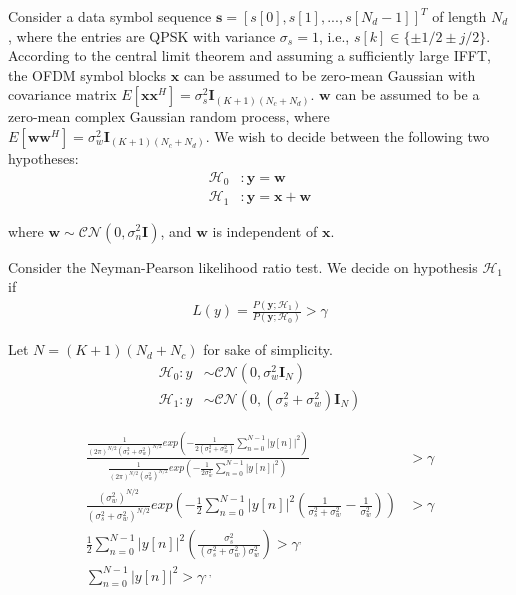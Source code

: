 \documentclass[a4 paper]{article}
\begin{document}
\setlength{\abovedisplayskip}{3pt}
\setlength{\belowdisplayskip}{3pt}


Consider a data symbol sequence $\mathbf{s} = [s[0], s[1], ..., s[N_{d} - 1]]^{T}$ of length $N_{d}$ , where the entries are QPSK with variance $\sigma_{s} = 1$, i.e., $s[k] \in \{\pm 1/ 2 \pm j/ 2\}$. According to the central limit theorem and assuming a sufficiently large IFFT, the OFDM symbol blocks $\mathbf{x}$ can be assumed to be zero-mean Gaussian with covariance matrix $E[\mathbf{x}\mathbf{x}^{H}] = \sigma_{s}^{2}\mathbf{I}_{(K+1)(N_{c} +N_{d})}$. $\mathbf{w}$ can be assumed to be a zero-mean complex Gaussian random process, where $E[\mathbf{w}\mathbf{w}^{H}] = \sigma_{w}^{2}\mathbf{I}_{(K+1)(N_c + N_d)}$. We wish to decide between the following two hypotheses:
\begin{align*}
	\mathcal{H}_{0} &: \mathbf{y} = \mathbf{w}	\\
	\mathcal{H}_{1} &: \mathbf{y} = \mathbf{x} + \mathbf{w}
\end{align*}

where $\mathbf{w} \sim \mathcal{CN}(0, \sigma_{n}^{2}\mathbf{I})$, and $\mathbf{w}$ is independent of $\mathbf{x}$.


\vspace{-2em}
\solution Consider the Neyman-Pearson likelihood ratio test. We decide on hypothesis $\mathcal{H}_{1}$ if
\begin{align*}
	L(y) = \frac{P(\mathbf{y}; \mathcal{H}_{1})}{P(\mathbf{y}; \mathcal{H}_{0})} > \gamma
\end{align*}

Let $N = (K + 1)(N_{d} + N_{c})$ for sake of simplicity.
\begin{align*}
	\mathcal{H}_{0}: y &\sim \mathcal{CN}(0, \sigma_{w}^{2}\mathbf{I}_{N})	\\
	\mathcal{H}_{1}: y &\sim \mathcal{CN}(0, (\sigma_{s}^{2} + \sigma_{w}^{2})\mathbf{I}_{N})	
\end{align*}


\begin{align*}
	\frac{\frac{1}{(2\pi)^{N/2}(\sigma_{s}^{2} + \sigma_{w}^{2})^{N/2}} exp \left(-\frac{1}{2(\sigma_{s}^{2} + \sigma_{w}^{2} )} \sum_{n=0}^{N-1} \vert y[n] \vert ^{2} \right)}{\frac{1}{(2\pi)^{N/2}(\sigma_{w}^{2})^{N/2}} exp \left(-\frac{1}{2\sigma_{w}^{2}} \sum_{n=0}^{N-1} \vert y[n] \vert ^{2} \right)} &> \gamma	\\
	\frac{(\sigma_{w}^{2})^{N/2}}{(\sigma_{s}^{2} + \sigma_{w}^{2})^{N/2}} exp \left(-\frac{1}{2} \sum_{n=0}^{N-1} \vert y[n] \vert ^{2} \left(\frac{1}{\sigma_{s}^{2} + \sigma_{w}^{2}} - \frac{1}{\sigma_{w}^{2}}\right) \right) &> \gamma \\
	\frac{1}{2} \sum_{n=0}^{N-1} \vert y[n] \vert ^{2} \left(\frac{\sigma_{s}^{2}}{(\sigma_{s}^{2} + \sigma_{w}^{2}) \sigma_{w}^{2}} \right) > \gamma^{,}	\\
	\sum_{n=0}^{N-1} \vert y[n] \vert ^{2} > \gamma^{,,}
\end{align*}
\end{document}

